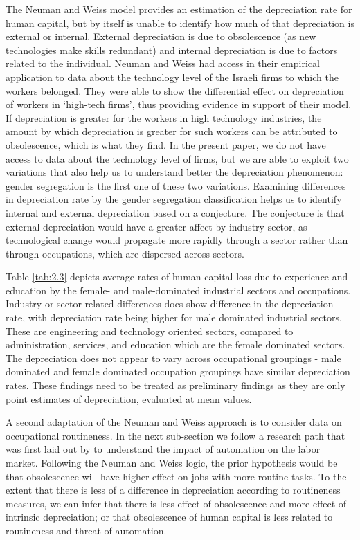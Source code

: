 \documentclass[alpha-refs]{wiley-article-02b}
\begin{document}
\noindent The Neuman and Weiss model provides an estimation of the 
depreciation rate 
for human capital, but by itself is unable to identify how much of that  
depreciation is external or internal. External depreciation is due to 
obsolescence (as new technologies make skills redundant) and internal 
depreciation is due to factors related to the individual. Neuman and Weiss 
had access in their empirical application to data about the technology 
level of the Israeli firms to which the workers belonged. They were able to 
show the differential effect on depreciation of workers in `high-tech 
firms', thus providing evidence in support of their model. If depreciation 
is greater for the workers in high technology industries, the amount by 
which depreciation is greater for such workers can be attributed to 
obsolescence, which is what they find. In the present paper, we do not have 
access to data about the technology level of firms, but we are able to 
exploit two variations that also help us to understand better the 
depreciation phenomenon: gender segregation is the first one of these two 
variations. Examining differences in depreciation rate by the gender 
segregation classification helps us to identify internal and external 
depreciation based on a conjecture. The conjecture is that external 
depreciation would have a greater affect by  industry sector, as 
technological change would propagate more rapidly through a sector rather 
than through occupations, which are dispersed across sectors. 

Table \ref{tab:2.3} depicts average rates of human capital loss due to 
experience and education by the female- and male-dominated industrial 
sectors and occupations. Industry or sector related differences does show 
difference in the depreciation rate, with depreciation rate being higher 
for male dominated industrial sectors. These are engineering and technology 
oriented sectors, compared to administration, services, and education which 
are the female dominated sectors. The depreciation does not appear to vary 
across occupational groupings - male dominated and female dominated 
occupation groupings have similar depreciation rates. These findings need 
to be treated as preliminary findings as they are only point estimates of 
depreciation, evaluated at mean values. 

A second adaptation of the Neuman and Weiss approach is to consider data on 
occupational routineness. In the next sub-section we follow a research path 
that was first laid out by \cite{acemoglu2011} to understand the impact of 
automation on the labor market. Following the Neuman and Weiss logic, the 
prior hypothesis would be that obsolescence will have higher effect on jobs 
with more routine tasks. To the extent that there is less of a difference 
in depreciation according to routineness measures, we can infer that there 
is less effect of obsolescence and more effect of intrinsic depreciation;  
or that obsolescence of human capital is less related to routineness and 
threat of automation. 
\end{document}
